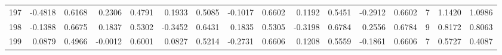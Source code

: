 \begin{tabular}{lrrrrrrrrrrrrrrr}
197 &     -0.4818 &  0.6168 &  0.2306 &  0.4791 &  0.1933 &  0.5085 & -0.1017 &  0.6602 &  0.1192 &  0.5451 &  -0.2912 &     0.6602 &      7 &                    1.1420 &                     1.0986 \\
198 &     -0.1388 &  0.6675 &  0.1837 &  0.5302 & -0.3452 &  0.6431 &  0.1835 &  0.5305 & -0.3198 &  0.6784 &   0.2556 &     0.6784 &      9 &                    0.8172 &                     0.8063 \\
199 &      0.0879 &  0.4966 & -0.0012 &  0.6001 &  0.0827 &  0.5214 & -0.2731 &  0.6606 &  0.1208 &  0.5559 &  -0.1861 &     0.6606 &      7 &                    0.5727 &                     0.4087 \\
\bottomrule
\end{tabular}
